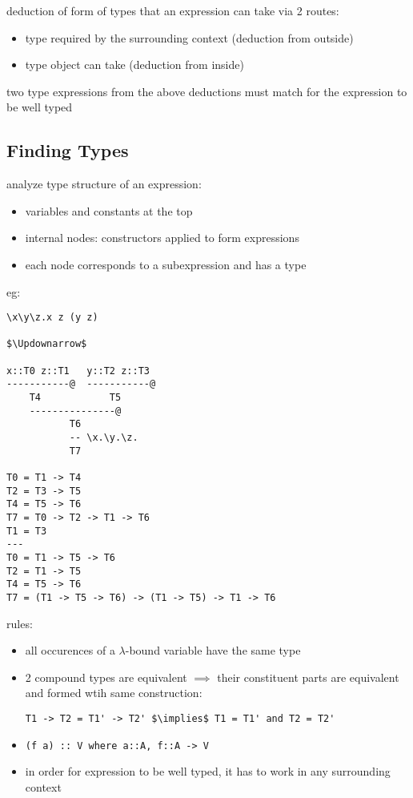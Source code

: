 \documentclass[8pt]{extarticle}
\begin{document}
\begin{multicols*}{2}

deduction of form of types that an expression can take via 2 routes:
\begin{itemize}
\item type required by the surrounding context (deduction from outside)
\item type object can take (deduction from inside)
\end{itemize}
two type expressions from the above deductions must match for the expression to be well typed

\vfill\null
\columnbreak

\subsection{Finding Types}

analyze type structure of an expression:
\begin{itemize}
\item variables and constants at the top
\item internal nodes: constructors applied to form expressions
\item each node corresponds to a subexpression and has a type
\end{itemize}

eg:
\begin{lstlisting}
\x\y\z.x z (y z)

$\Updownarrow$

x::T0 z::T1   y::T2 z::T3
-----------@  -----------@
    T4            T5
    ---------------@
           T6
           -- \x.\y.\z.
           T7

T0 = T1 -> T4
T2 = T3 -> T5
T4 = T5 -> T6
T7 = T0 -> T2 -> T1 -> T6
T1 = T3
---
T0 = T1 -> T5 -> T6
T2 = T1 -> T5
T4 = T5 -> T6
T7 = (T1 -> T5 -> T6) -> (T1 -> T5) -> T1 -> T6
\end{lstlisting}
         
rules:
\begin{itemize}
\item all occurences of a $\lambda$-bound variable have the same type
\item 2 compound types are equivalent $\implies$ their constituent parts are equivalent and formed wtih same construction:
\begin{lstlisting}
T1 -> T2 = T1' -> T2' $\implies$ T1 = T1' and T2 = T2'
\end{lstlisting}
\item \verb|(f a) :: V where a::A, f::A -> V|
\item in order for expression to be well typed, it has to work in any surrounding context
\end{itemize}


\end{multicols*}
\end{document}
